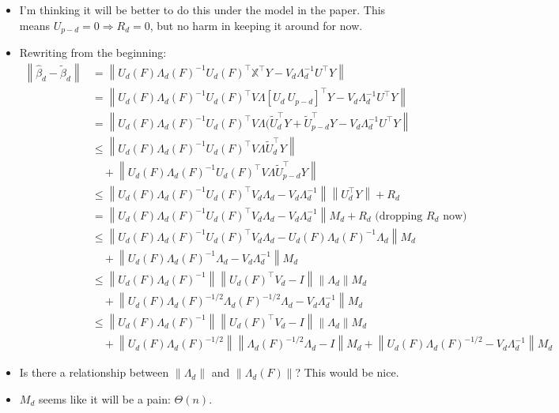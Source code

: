 \documentclass[11pt]{article}
\newcommand{\norm}[1]{\left\lVert #1 \right\rVert}
\newcommand{\X}{\mathbb{X}}
\begin{document}
 \begin{itemize}
 \item I'm thinking it will be better to do this under the model in the
   paper. This means $U_{p-d}=0\Rightarrow R_d=0$, but no harm in
   keeping it around for now.
 \item Rewriting from the beginning:
   \begin{align}
     \norm{\hat\beta_d-\tilde\beta_d}
     &= \norm{ U_d(F )\Lambda_d(F )^{-1}U_d(F )^\top \X^\top
       Y - V_d\Lambda_d^{-1}U^\top Y}\\
     &= \norm{U_d(F )\Lambda_d(F )^{-1}U_d(F )^\top V\Lambda[U_d\ U_{p-d}]^\top
       Y - V_d\Lambda_d^{-1}U^\top Y}\\
     &= \norm{U_d(F )\Lambda_d(F )^{-1}U_d(F )^\top V\Lambda(\tilde
       U_d^\top Y +\tilde U_{p-d}^\top Y
       - V_d\Lambda_d^{-1}U^\top Y}\\
     &\leq \norm{U_d(F )\Lambda_d(F )^{-1}U_d(F )^\top V\Lambda\tilde
       U_d^\top Y}\\
     &\quad + \norm{U_d(F )\Lambda_d(F )^{-1}U_d(F )^\top V\Lambda
       \tilde U_{p-d}^\top Y}\\
     &\leq \norm{U_d(F)\Lambda_d(F)^{-1}U_d(F)^\top V_d\Lambda_d -
       V_d\Lambda_d^{-1}} \norm{U_d^\top Y} + R_d\\
     &=\norm{U_d(F)\Lambda_d(F)^{-1}U_d(F)^\top V_d\Lambda_d -
       V_d\Lambda_d^{-1}} M_d + R_d \mbox{ (dropping $R_d$ now)}\\
     &\leq \norm{U_d(F)\Lambda_d(F)^{-1}U_d(F)^\top V_d\Lambda_d -
       U_d(F)\Lambda_d(F)^{-1}\Lambda_d}M_d\\
     &\quad + \norm{U_d(F)\Lambda_d(F)^{-1}\Lambda_d -
       V_d\Lambda_d^{-1}} M_d\\
     &\leq \norm{U_d(F)\Lambda_d(F)^{-1}}\norm{U_d(F)^\top
       V_d-I}\norm{\Lambda_d} M_d\\
     &\quad +\norm{U_d(F)\Lambda_d(F)^{-1/2}\Lambda_d(F)^{-1/2}\Lambda_d -
       V_d\Lambda_d^{-1}} M_d\\
     &\leq \norm{U_d(F)\Lambda_d(F)^{-1}}\norm{U_d(F)^\top
       V_d-I}\norm{\Lambda_d} M_d\\
     &\quad
       +\norm{U_d(F)\Lambda_d(F)^{-1/2}}\norm{\Lambda_d(F)^{-1/2}\Lambda_d
       - I}M_d + \norm{U_d(F)\Lambda_d(F)^{-1/2}-
       V_d\Lambda_d^{-1}} M_d
   \end{align}
 \item Is there a relationship between $\norm{\Lambda_d}$ and
   $\norm{\Lambda_d(F)}$? This would be nice.
 \item $M_d$ seems like it will be a pain: $\Theta(n)$.
 \end{itemize}
\end{document}
